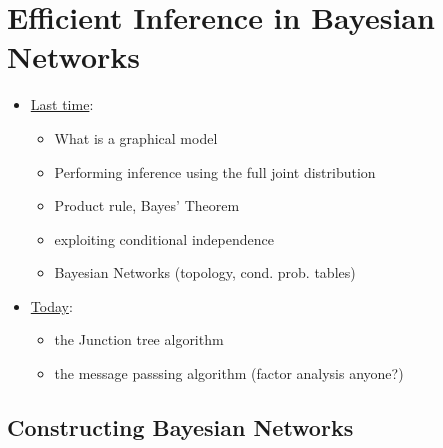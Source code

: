 \section{Efficient Inference in Bayesian Networks}

\begin{frame} 

\end{frame}

\begin{frame}

\begin{itemize}
\item \underline{Last time}:
\begin{itemize}
\item What is a graphical model
\item Performing inference using the full joint distribution
\item Product rule, Bayes' Theorem
\item exploiting conditional independence
\item Bayesian Networks (topology, cond. prob. tables)
\end{itemize}

\pause

\item \underline{Today}:
\begin{itemize}
\item the Junction tree algorithm
\item the message passsing algorithm (factor analysis anyone?)
\end{itemize}
\end{itemize}

\end{frame}

\subsection{Constructing Bayesian Networks}

